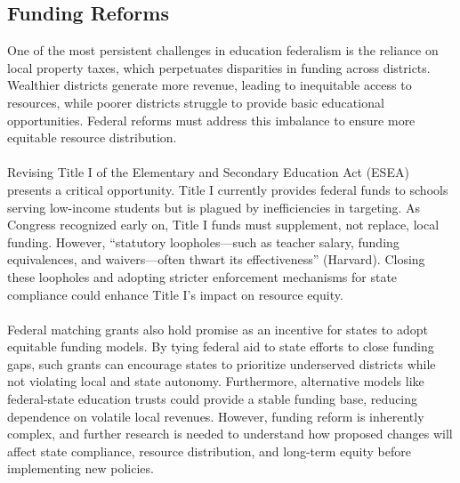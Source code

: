 \documentclass[11pt]{extarticle}
\begin{document}
\subsection{Funding Reforms}
One of the most persistent challenges in education federalism is the reliance on local property taxes, which perpetuates disparities in funding across districts. 
Wealthier districts generate more revenue, leading to inequitable access to resources, while poorer districts struggle to provide basic educational opportunities. 
Federal reforms must address this imbalance to ensure more equitable resource distribution.\\
\\
Revising Title I of the Elementary and Secondary Education Act (ESEA) presents a critical opportunity. Title I currently provides federal funds to schools serving low-income students but is plagued by inefficiencies in targeting. As Congress recognized early on, Title I funds must supplement, not replace, local funding. However, “statutory loopholes—such as teacher salary, funding equivalences, and waivers—often thwart its effectiveness” (Harvard). Closing these loopholes and adopting stricter enforcement mechanisms for state compliance could enhance Title I's impact on resource equity.\\
\\
Federal matching grants also hold promise as an incentive for states to adopt equitable funding models. By tying federal aid to state efforts to close funding gaps, such grants can encourage states to prioritize underserved districts while not violating local and state autonomy. Furthermore, alternative models like federal-state education trusts could provide a stable funding base, reducing dependence on volatile local revenues.
However, funding reform is inherently complex, and further research is needed to understand how proposed changes will affect state compliance, resource distribution, and long-term equity before implementing new policies.
\end{document}
